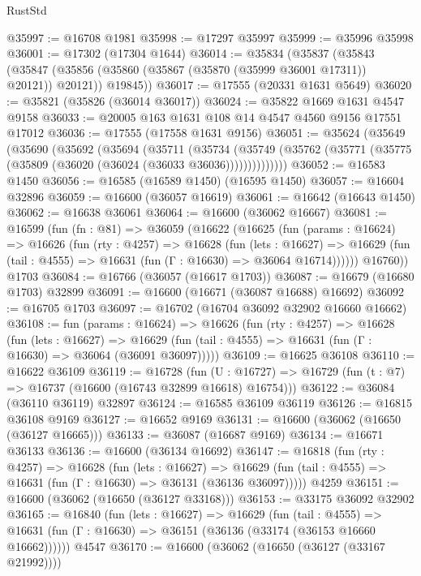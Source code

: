 \begin{lexlean}{RustStd}
\begin{coremodule}
{\begin{coremodule}
{{{{{{{{{{{{{{{{{{{{{{{{{{{{{{{{{{{{{{{{{{{{{{{{{{{{{{{@35997 := @16708 @1981
@35998 := @17297 @35997
@35999 := @35996 @35998
@36001 := @17302 (@17304 @1644)
@36014 := @35834
    (@35837
      (@35843
        (@35847 (@35856 (@35860 (@35867 (@35870 (@35999 @36001 @17311)) @20121)) @20121))
        @19845))
@36017 := @17555 (@20331 @1631 @5649)
@36020 := @35821 (@35826 (@36014 @36017))
@36024 := @35822 @1669 @1631 @4547 @9158
@36033 := @20005 @163 @1631 @108 @14 @4547 @4560 @9156 @17551 @17012
@36036 := @17555 (@17558 @1631 @9156)
@36051 := @35624
    (@35649
      (@35690
        (@35692
          (@35694
            (@35711
              (@35734
                (@35749 (@35762 (@35771 (@35775 (@35809 (@36020 (@36024 (@36033 @36036))))))))))))))
@36052 := @16583 @1450
@36056 := @16585 (@16589 @1450) (@16595 @1450)
@36057 := @16604 @32896
@36059 := @16600 (@36057 @16619)
@36061 := @16642 (@16643 @1450)
@36062 := @16638 @36061
@36064 := @16600 (@36062 @16667)
@36081 := @16599
    (fun (fn : @81) =>
    @36059
      (@16622
        (@16625
          (fun (params : @16624) =>
          @16626
            (fun (rty : @4257) =>
            @16628
              (fun (lets : @16627) =>
              @16629 (fun (tail : @4555) => @16631 (fun (Γ : @16630) => @36064 @16714))))))
        @16760))
    @1703
@36084 := @16766 (@36057 (@16617 @1703))
@36087 := @16679 (@16680 @1703) @32899
@36091 := @16600 (@16671 (@36087 @16688) @16692)
@36092 := @16705 @1703
@36097 := @16702 (@16704 @36092 @32902 @16660 @16662)
@36108 := fun (params : @16624) =>
  @16626
    (fun (rty : @4257) =>
    @16628
      (fun (lets : @16627) =>
      @16629 (fun (tail : @4555) => @16631 (fun (Γ : @16630) => @36064 (@36091 @36097)))))
@36109 := @16625 @36108
@36110 := @16622 @36109
@36119 := @16728
    (fun (U : @16727) => @16729 (fun (t : @7) => @16737 (@16600 (@16743 @32899 @16618) @16754)))
@36122 := @36084 (@36110 @36119) @32897
@36124 := @16585 @36109 @36119
@36126 := @16815 @36108 @9169
@36127 := @16652 @9169
@36131 := @16600 (@36062 (@16650 (@36127 @16665)))
@36133 := @36087 (@16687 @9169)
@36134 := @16671 @36133
@36136 := @16600 (@36134 @16692)
@36147 := @16818
    (fun (rty : @4257) =>
    @16628
      (fun (lets : @16627) =>
      @16629 (fun (tail : @4555) => @16631 (fun (Γ : @16630) => @36131 (@36136 @36097)))))
    @4259
@36151 := @16600 (@36062 (@16650 (@36127 @33168)))
@36153 := @33175 @36092 @32902
@36165 := @16840
    (fun (lets : @16627) =>
    @16629
      (fun (tail : @4555) =>
      @16631 (fun (Γ : @16630) => @36151 (@36136 (@33174 (@36153 @16660 @16662))))))
    @4547
@36170 := @16600 (@36062 (@16650 (@36127 (@33167 @21992))))
}}}}}}}}}}}}}}}}}}}}}}}}}}}}}}}}}}}}}}}}}}}}}}}}}}}}}}}
\end{coremodule}}
\end{coremodule}
\end{lexlean}
